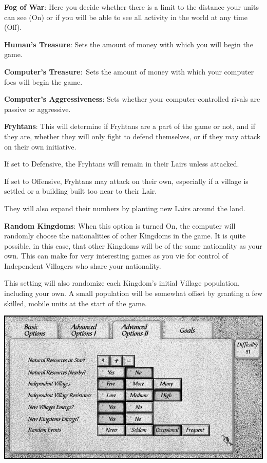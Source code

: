 \textbf{Fog of War}: Here you decide whether there is a limit to the distance your units can see (On) or if you will be able to see all activity in the world at any time (Off).

\textbf{Human’s Treasure}: Sets the amount of money with which you will begin the game.

\textbf{Computer’s Treasure}: Sets the amount of money with which your computer foes will begin the game.

\textbf{Computer’s Aggressiveness}: Sets whether your computer-controlled rivals are passive or aggressive.

\textbf{Fryhtans}: This will determine if Fryhtans are a part of the game or not, and if they are, whether they will only fight to defend themselves, or if they may attack on their own initiative.

\begin{changemargin}{.5cm}{0cm}
If set to Defensive, the Fryhtans will remain in their Lairs unless attacked.

If set to Offensive, Fryhtans may attack on their own, especially if a village is settled or a building built too near to their Lair. 

They will also expand their numbers by planting new Lairs around the land.
\end{changemargin}

\textbf{Random Kingdoms}: When this option is turned On, the computer will randomly choose the nationalities of other Kingdoms in the game. It is quite possible, in this case, that other Kingdoms will be of the same nationality as your own. This can make for very interesting games as you vie for control of Independent Villagers who share your nationality.

This setting will also randomize each Kingdom’s initial Village population, including your own. A small population will be somewhat offset by granting a few skilled, mobile units at the start of the game.

\begin{center}
	\includegraphics[width=0.9\linewidth]{Iadvancedoptions2}
\end{center}


